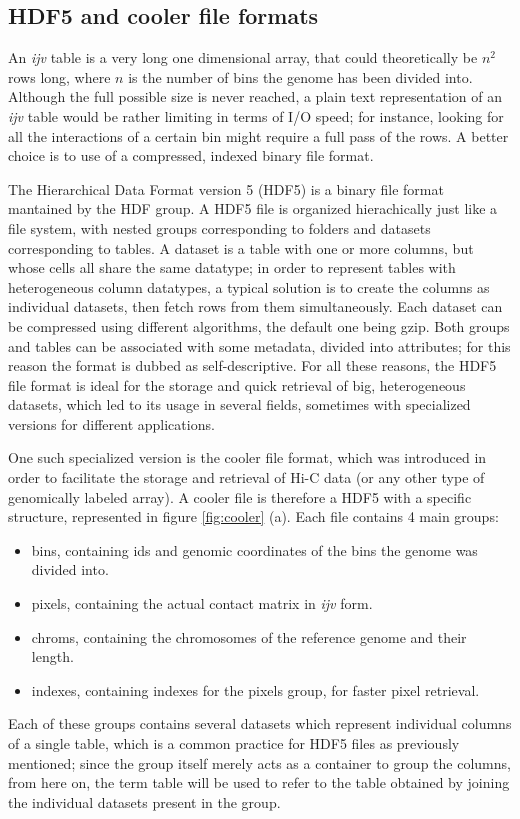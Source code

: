 \subsection{HDF5 and cooler file formats}
An \emph{ijv} table is a very long one dimensional array, that could theoretically be $n^2$ rows long, where $n$ is the number of bins the genome has been divided into. Although the full possible size is never reached, a plain text representation of an \emph{ijv} table would be rather limiting in terms of I/O speed; for instance, looking for all the interactions of a certain bin might require a full pass of the rows. A better choice is to use of a compressed, indexed binary file format. 

The Hierarchical Data Format version 5 (HDF5) is a binary file format mantained by the HDF group\cite{hdfgroup}. A HDF5 file is organized hierachically just like a file system, with nested groups corresponding to folders and datasets corresponding to tables. A dataset is a table with one or more columns, but whose cells all share the same datatype; in order to represent tables with heterogeneous column datatypes, a typical solution is to create the columns as individual datasets, then fetch rows from them simultaneously. Each dataset can be compressed using different algorithms, the default one being gzip. Both groups and tables can be associated with some metadata, divided into attributes; for this reason the format is dubbed as self-descriptive. For all these reasons, the HDF5 file format is ideal for the storage and quick retrieval of big, heterogeneous datasets, which led to its usage in several fields, sometimes with specialized versions for different applications.

One such specialized version is the cooler file format, which was introduced in order to facilitate the storage and retrieval of Hi-C data (or any other type of genomically labeled array)\cite{cooler2020}. A cooler file is therefore a HDF5 with a specific structure, represented in figure \ref{fig:cooler} (a). Each file contains 4 main groups:
\begin{itemize}\tightlist
  \item bins, containing ids and genomic coordinates of the bins the genome was divided into.
  \item pixels, containing the actual contact matrix in \emph{ijv} form.
  \item chroms, containing the chromosomes of the reference genome and their length.
  \item indexes, containing indexes for the pixels group, for faster pixel retrieval.
\end{itemize}
Each of these groups contains several datasets which represent individual columns of a single table, which is a common practice for HDF5 files as previously mentioned; since the group itself merely acts as a container to group the columns, from here on, the term table will be used to refer to the table obtained by joining the individual datasets present in the group.

